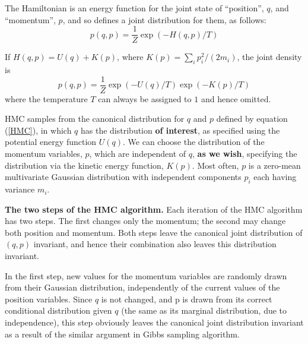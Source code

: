 \documentclass[a4paper]{report}
\begin{document}
The Hamiltonian is an energy function for the joint state of ``position'', $q$, and ``momentum'', $p$, and so defines a joint distribution for them, as follows:
\begin{equation}
	p(q,p) = \frac{1}{Z} \exp (-H(q,p)/T)
\end{equation}

If $H(q,p) = U(q)+K(p)$, where $K(p) = \sum_i p_i^2 /(2m_i)$, the joint density is
\begin{equation}
	p(q,p) = \frac{1}{Z} \exp(-U(q)/T) \exp(-K(p)/T) \label{HMC}
\end{equation}
where the temperature $T$ can always be assigned to $1$ and hence omitted.

HMC samples from the canonical distribution for $q$ and $p$ defined by equation (\ref{HMC}), in which $q$ has the distribution \textbf{of interest}, as specified using the potential energy function $U(q)$. We can choose the distribution of the momentum variables, $p$, which are independent of $q$, \textbf{as we wish}, specifying the distribution via the kinetic energy function, $K(p)$. Most often, $p$ is a zero-mean multivariate Gaussian distribution with independent components $p_i$ each having variance $m_i$. 

\textbf{The two steps of the HMC algorithm.} Each iteration of the HMC algorithm has two
steps. The first changes only the momentum; the second may change both position and
momentum. Both steps leave the canonical joint distribution of $(q, p)$ invariant, and hence
their combination also leaves this distribution invariant.

In the first step, new values for the momentum variables are randomly drawn from their
Gaussian distribution, independently of the current values of the position variables. Since $q$ is not changed, and p is drawn from its correct conditional distribution given $q$ (the same as its marginal distribution, due to independence),
this step obviously leaves the canonical joint distribution invariant as a result of the similar argument in Gibbs sampling algorithm.
\end{document}
